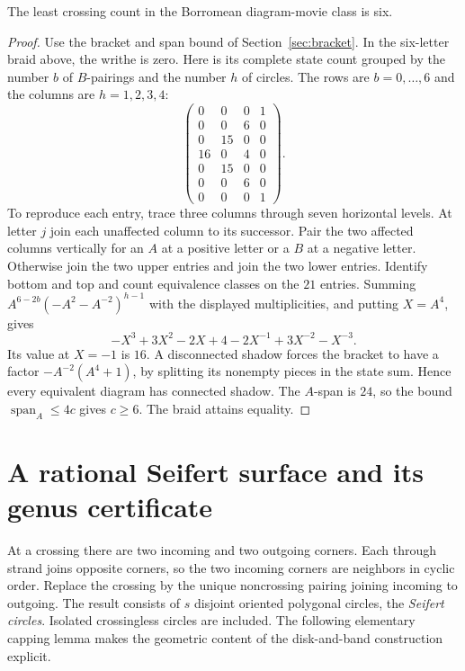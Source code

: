 \begin{corollary}
The least crossing count in the Borromean diagram-movie class is six.
\end{corollary}
\begin{proof}
Use the bracket and span bound of Section~\ref{sec:bracket}. In the
six-letter braid above, the writhe is zero. Here is its complete state
count grouped by the number $b$ of $B$-pairings and the number $h$ of
circles. The rows are $b=0,\ldots,6$ and the columns are $h=1,2,3,4$:
\[
  \begin{pmatrix}
  0&0&0&1\\0&0&6&0\\0&15&0&0\\16&0&4&0\\
  0&15&0&0\\0&0&6&0\\0&0&0&1
  \end{pmatrix}.
\]
To reproduce each entry, trace three columns through seven horizontal
levels. At letter $j$ join each unaffected column to its successor.
Pair the two affected columns vertically for an $A$ at a positive
letter or a $B$ at a negative letter. Otherwise join the two upper
entries and join the two lower entries. Identify bottom and top and
count equivalence classes on the $21$ entries. Summing
$A^{6-2b}(-A^2-A^{-2})^{h-1}$ with the displayed multiplicities, and
putting $X=A^4$, gives
\[
 -X^3+3X^2-2X+4-2X^{-1}+3X^{-2}-X^{-3}.
\]
Its value at $X=-1$ is $16$. A disconnected shadow forces the bracket
to have a factor $-A^{-2}(A^4+1)$, by splitting its nonempty pieces
in the state sum. Hence every equivalent diagram has connected shadow.
The $A$-span is $24$, so the bound $\operatorname{span}_A\le4c$ gives
$c\ge6$. The braid attains equality.
\end{proof}

\section{A rational Seifert surface and its genus certificate}
\label{sec:seifert}
At a crossing there are two incoming and two outgoing corners. Each
through strand joins opposite corners, so the two incoming corners
are neighbors in cyclic order. Replace the crossing by the unique
noncrossing pairing joining incoming to outgoing. The result consists of
$s$ disjoint oriented polygonal circles, the \emph{Seifert circles}.
Isolated crossingless circles are included. The following elementary
capping lemma makes the geometric content of the disk-and-band construction
explicit.


